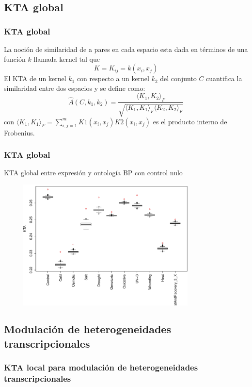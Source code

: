\documentclass[serif,9pt, t]{beamer}
\begin{document}
\subsection{KTA global}
\begin{frame}\frametitle{KTA global} 
La noción de similaridad de a pares en cada espacio esta dada en términos de una función $k$ llamada kernel tal que
\begin{equation}
	K = K_{ij} = k(x_i, x_j)
\end{equation}
\bigskip
El KTA de un kernel $k_1$ con respecto a un kernel $k_2$ del conjunto $C$ cuantifica la similaridad entre dos espacios y se define como:
\begin{equation}
	\hat{A}(C, k_1, k_2) = \frac{\langle K_1, K_2 \rangle _F}{\sqrt{\langle K_1, K_1 \rangle _F \langle K_2, K_2 \rangle _F}}
\end{equation}
con $\langle K_1, K_1 \rangle _F = \sum_{i,j=1}^m K1(x_i, x_j)K2(x_i, x_j)$ es el producto interno de Frobenius.\\
\end{frame}

\begin{frame}\frametitle{KTA global} 
\centering
KTA global entre expresión y ontología BP con control nulo
\begin{figure}
    	\centering
	\includegraphics[width=0.8\textwidth]{kta_global_bpb.pdf}
\end{figure}
\centering
\end{frame}

\subsection{Modulación de heterogeneidades
transcripcionales}
\begin{frame}
\frametitle{KTA local para modulación de heterogeneidades transcripcionales} 
\end{frame}
\end{document}
